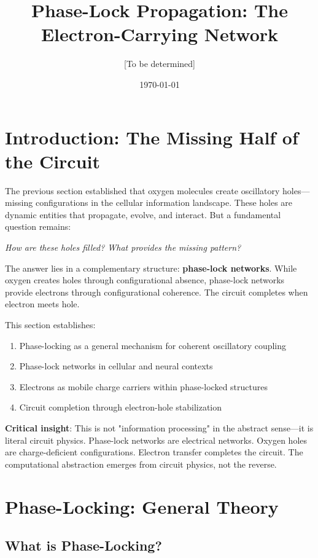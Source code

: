 \documentclass[11pt]{article}
\title{Phase-Lock Propagation: The Electron-Carrying Network}
\author{[To be determined]}
\date{\today}
\theoremstyle{remark}
\begin{document}
\maketitle

\section{Introduction: The Missing Half of the Circuit}

The previous section established that oxygen molecules create oscillatory holes—missing configurations in the cellular information landscape. These holes are dynamic entities that propagate, evolve, and interact. But a fundamental question remains:

\textit{How are these holes filled? What provides the missing pattern?}

The answer lies in a complementary structure: \textbf{phase-lock networks}. While oxygen creates holes through configurational absence, phase-lock networks provide electrons through configurational coherence. The circuit completes when electron meets hole.

This section establishes:
\begin{enumerate}
\item Phase-locking as a general mechanism for coherent oscillatory coupling
\item Phase-lock networks in cellular and neural contexts
\item Electrons as mobile charge carriers within phase-locked structures
\item Circuit completion through electron-hole stabilization
\end{enumerate}

\textbf{Critical insight}: This is not "information processing" in the abstract sense—it is literal circuit physics. Phase-lock networks are electrical networks. Oxygen holes are charge-deficient configurations. Electron transfer completes the circuit. The computational abstraction emerges from circuit physics, not the reverse.

\section{Phase-Locking: General Theory}

\subsection{What is Phase-Locking?}
\end{document}
